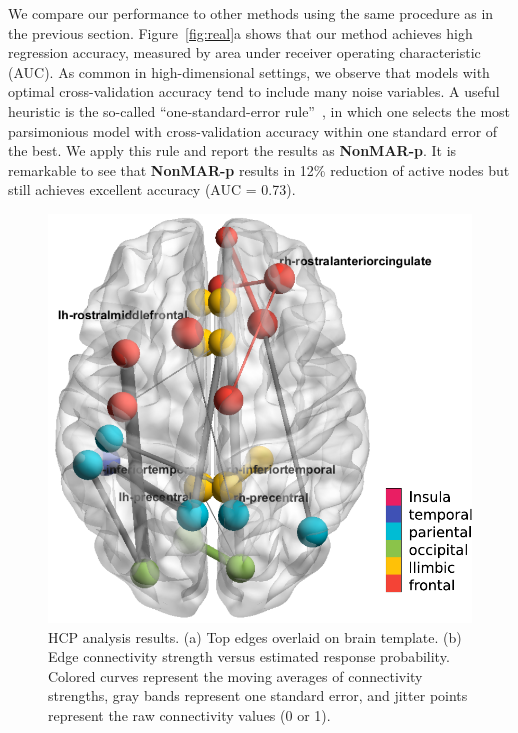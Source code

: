 \documentclass[11pt]{article}
\theoremstyle{definition}
\begin{document}
We compare our performance to other methods using the same procedure as in the previous section. Figure~\ref{fig:real}a shows that our method achieves high regression accuracy, measured by area under receiver operating characteristic (AUC). As common in high-dimensional settings, we observe that models with optimal cross-validation accuracy tend to include many noise variables. A useful heuristic is the so-called ``one-standard-error rule''~\citep{hastie2015statistical}, in which one selects the most parsimonious model with cross-validation accuracy within one standard error of the best. We apply this rule and report the results as {\bf \small NonMAR-p}. It is remarkable to see that {\bf \small NonMAR-p} results in 12\% reduction of active nodes but still achieves excellent accuracy (AUC = 0.73). 

\begin{figure}[H]
    \centering
       \includegraphics[width=\textwidth]{brain.pdf}
 \caption{HCP analysis results. (a) Top edges overlaid on brain template. (b) Edge connectivity strength versus estimated response probability. Colored curves represent the moving averages of connectivity strengths, gray bands represent one standard error, and jitter points represent the raw connectivity values (0 or 1). }\label{fig:real2}
\end{figure}
\end{document}
